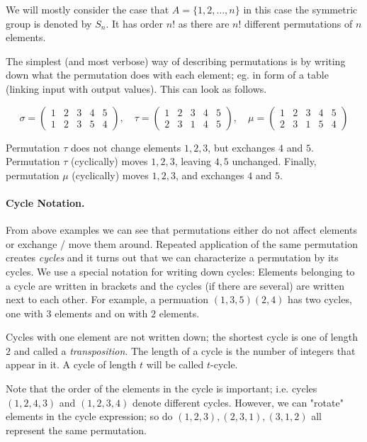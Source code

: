 We will mostly consider the case that $A = \{1, 2, \ldots, n\}$ in this case the symmetric group is denoted by $S_n$. It has order $n!$ as there are $n!$ different permutations of $n$ elements.

The simplest (and most verbose) way of describing permutations is by writing down what the permutation does with each element; eg. in form of a table (linking input with output values). This can look as follows.

\[
\sigma =
\begin{pmatrix}
1 & 2 & 3 & 4 & 5 \\
1 & 2 & 3 & 5 & 4
\end{pmatrix}
,\quad \tau = 
\begin{pmatrix}
1 & 2 & 3 & 4 & 5 \\
2 & 3 & 1 & 4 & 5
\end{pmatrix}
, \quad \mu = 
\begin{pmatrix}
1 & 2 & 3 & 4 & 5 \\
2 & 3 & 1 & 5 & 4
\end{pmatrix}
\]

Permutation $\tau$ does not change elements $1, 2, 3$, but exchanges $4$ and $5$. Permutation $\tau$ (cyclically) moves $1, 2, 3$, leaving $4, 5$ unchanged. Finally, permutation $\mu$ (cyclically) moves $1, 2, 3$, and exchanges $4$ and $5$.

\paragraph{Cycle Notation.} From above examples we can see that permutations either do not affect elements or exchange / move them around. Repeated application of the same permutation creates \emph{cycles} and it turns out that we can characterize a permutation by its cycles. We use a special notation for writing down cycles: Elements belonging to a cycle are written in brackets and the cycles (if there are several) are written next to each other. For example, a permuation $(1,3,5)(2,4)$ has two cycles, one with $3$ elements and on with $2$ elements.

Cycles with one element are not written down; the shortest cycle is one of length $2$ and called a \emph{transposition}. The length of a cycle is the number of integers that appear in it. A cycle of length $t$ will be called $t$-cycle.

Note that the order of the elements in the cycle is important; i.e. cycles $(1,2,4,3)$ and $(1,2,3,4)$ denote different cycles. However, we can "rotate" elements in the cycle expression; so do $(1,2,3), (2,3,1), (3,1,2)$ all represent the same permutation.

